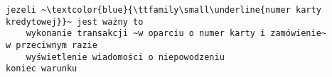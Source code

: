 \documentclass[a4paper,12pt]{book}
\begin{document}
	\begin{lstlisting}[numbers=none,escapechar=~]
jezeli ~\textcolor{blue}{\ttfamily\small\underline{numer karty kredytowej}}~ jest ważny to
    wykonanie transakcji ~w oparciu o numer karty i zamówienie~
w przeciwnym razie
    wyświetlenie wiadomości o niepowodzeniu
koniec warunku
	\end{lstlisting}
		
		
\end{document}
